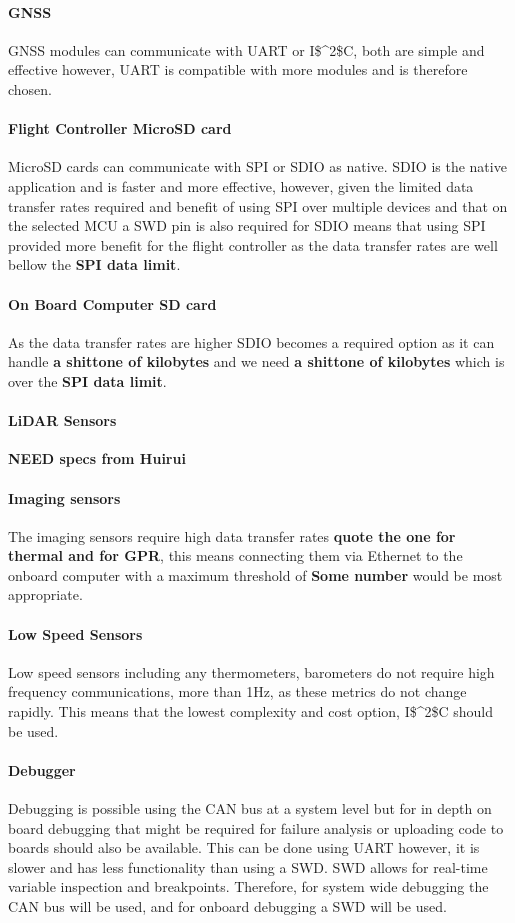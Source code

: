 \paragraph{\gls{GNSS}}
\gls{GNSS} modules can communicate with \gls{UART} or \gls{I$^2$C}, both are simple and effective however, \gls{UART} is compatible with more modules and is therefore chosen.
\paragraph{Flight Controller MicroSD card}
MicroSD cards can communicate with \gls{SPI} or \gls{SDIO} as native. \gls{SDIO} is the native application and is faster and more effective, however, given the limited data transfer rates required and benefit of using \gls{SPI} over multiple devices and that on the selected \gls{MCU} a \gls{SWD} pin is also required for \gls{SDIO} means that using \gls{SPI} provided more benefit for the flight controller as the data transfer rates are well bellow the \textbf{SPI data limit}.
\paragraph{On Board Computer SD card}
As the data transfer rates are higher \gls{SDIO} becomes a required option as it can handle \textbf{a shittone of kilobytes} and we need \textbf{a shittone of kilobytes} which is over the \textbf{SPI data limit}.
\paragraph{\gls{LiDAR} Sensors}
\textbf{NEED specs from Huirui}
\paragraph{Imaging sensors}
The imaging sensors require high data transfer rates \textbf{quote the one for thermal and for GPR}, this means connecting them via Ethernet to the onboard computer with a maximum threshold of \textbf{Some number} would be most appropriate.
\paragraph{Low Speed Sensors}
Low speed sensors including any thermometers, barometers do not require high frequency 
communications, more than 1Hz, as these metrics do not change rapidly. This means that the lowest complexity and cost option, \gls{I$^2$C} should be used.
\paragraph{Debugger}
Debugging is possible using the \gls{CAN} bus at a system level but for in depth on board debugging that might be required for failure analysis or uploading code to boards should also be available. This can be done using \gls{UART} however, it is slower and has less functionality than using a \gls{SWD}. \gls{SWD} allows for real-time variable inspection and breakpoints. Therefore, for system wide debugging the \gls{CAN} bus will be used, and for onboard debugging a \gls{SWD} will be used.

